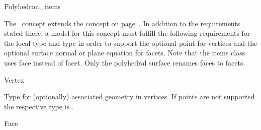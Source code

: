 
\ccRefPageBegin



\begin{ccRefConcept}{Polyhedron_items}

\ccDefinition

The \ccRefName\ concept extends the  concept on
page~\pageref{pageHalfedgeDSitemsRef}. In addition to the requirements
stated there, a model for this concept must fulfill the following
requirements for the local
 type and
 type
in order to support the optional point for vertices and the optional
surface normal or plane equation for facets. Note that the items class
uses face instead of facet. Only the polyhedral surface renames faces
to facets.

\begin{ccClass}{Vertex}


Type for (optionally) associated geometry in vertices. If points
are not supported the respective type is .



\ccTagFullDeclarations
{}

\ccGlue
{}

\ccTagDefaults
\end{ccClass}

\begin{ccClass}{Face}


\end{ccClass}
\end{ccRefConcept}
